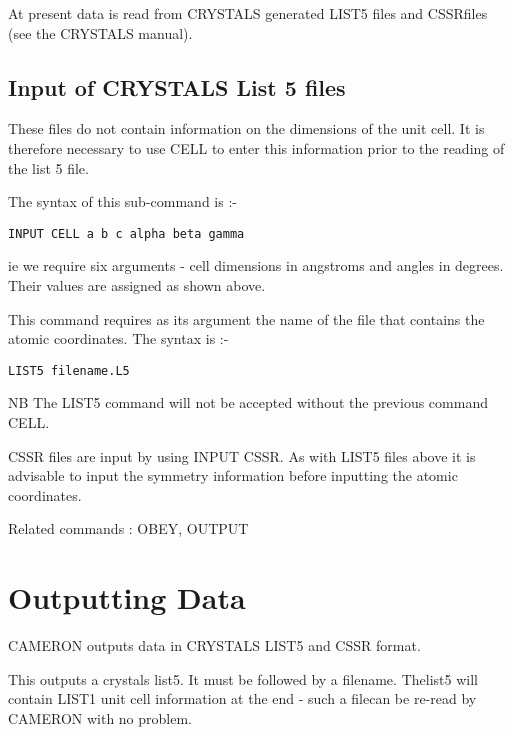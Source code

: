 \documentclass[10pt,a4paper]{report}
\begin{document}
At present data is read from CRYSTALS generated LIST5 files and CSSRfiles (see the CRYSTALS manual).\section{Input of CRYSTALS List 5 files}


These files do not contain information on the dimensions of the unit
cell. It is therefore necessary to use CELL to enter this information
prior to the reading of the list 5 file.


\bigskip{}




\bigskip{}
The syntax of this sub-command is :-
\small\begin{verbatim}
INPUT CELL a b c alpha beta gamma
\end{verbatim}\normalsize


ie we require six arguments - cell dimensions in angstroms and angles in
degrees. Their values are assigned as shown above.


\bigskip{}
This command requires as its argument the name of the file that contains
the atomic coordinates. The syntax is :-
\small\begin{verbatim}
LIST5 filename.L5
\end{verbatim}\normalsize


NB The LIST5 command will not be accepted without the previous command
CELL.


\bigskip{}


CSSR files are input by using INPUT CSSR. As with LIST5 files above
it is advisable to input the symmetry information before inputting the
atomic coordinates.


Related commands : OBEY, OUTPUT
\chapter{Outputting Data}

\bigskip{}



CAMERON outputs data in CRYSTALS LIST5 and CSSR format.

\bigskip{}This outputs a crystals list5. It must be followed by a filename. Thelist5 will contain LIST1 unit cell information at the end - such a filecan be re-read by CAMERON with no problem.

\bigskip{}
\end{document}

